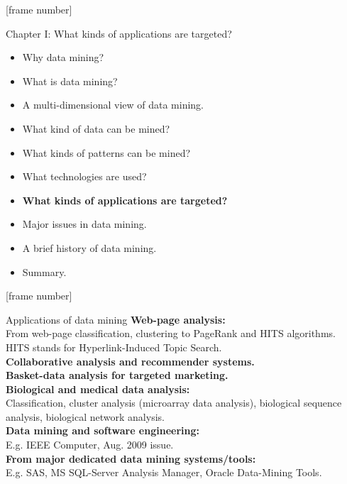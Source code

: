 \documentclass[aspectratio=169,t]{beamer}
\begin{document}
  {
    [frame number]
    \begin{frame}{Chapter I: What kinds of applications are targeted?}
        \begin{itemize}
            \item Why data mining?
            \item What is data mining?
            \item A multi-dimensional view of data mining.
            \item What kind of data can be mined?
            \item What kinds of patterns can be mined?
            \item What technologies are used?
            \item \textbf{What kinds of applications are targeted?}
            \item Major issues in data mining.
            \item A brief history of data mining.
            \item Summary.
        \end{itemize}
    \end{frame}
  }

  {
    [frame number]
    \begin{frame}{Applications of data mining}
    \textbf{Web-page analysis:}\\
    From web-page classification, clustering to PageRank and HITS algorithms.\\
    HITS stands for Hyperlink-Induced Topic Search.\\[0.2cm]
    \textbf{Collaborative analysis and recommender systems.}\\
    \textbf{Basket-data analysis for targeted marketing.}\\
    \textbf{Biological and medical data analysis:}\\
    Classification, cluster analysis (microarray data analysis), biological sequence analysis, biological network analysis.\\[0.2cm]
    \textbf{Data mining and software engineering:}\\
    E.g. IEEE Computer, Aug. 2009 issue.\\
    \textbf{From major dedicated data mining systems/tools:}\\
    E.g. SAS, MS SQL-Server Analysis Manager, Oracle Data-Mining Tools.
    \end{frame}
  }
\end{document}
